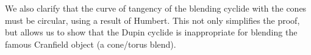 We also clarify that the curve of tangency of the blending cyclide
with the cones must be circular, using a result of Humbert.
This not only simplifies the proof, but allows us to show
that the Dupin cyclide is inappropriate for blending the famous
Cranfield object (a cone/torus blend).




